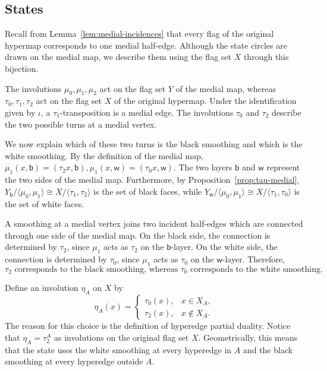 \documentclass{article}
\theoremstyle{definition}
\theoremstyle{remark}
\begin{document}
\subsection{States}

Recall from Lemma~\ref{lem:medial-incidences} that every flag of the original hypermap corresponds to one medial half-edge. Although the state circles are drawn on the medial
map, we describe them using the flag set $X$ through this bijection.

The involutions $\mu_0,\mu_1,\mu_2$ act on the flag set $Y$ of the medial
map, whereas $\tau_0,\tau_1,\tau_2$ act on the flag set $X$ of the original
hypermap. Under the identification given by $\iota$, a
$\tau_1$-transposition is a medial edge. The involutions $\tau_0$ and
$\tau_2$ describe the two possible turns at a medial vertex.

We now explain which of these two turns is the black smoothing and which is
the white smoothing. By the definition of the medial map,
 $\mu_1(x,\mathsf b)=(\tau_2x,\mathsf b),\mu_1(x,\mathsf w)=(\tau_0x,\mathsf w)$. The two layers $\mathsf b$ and $\mathsf w$ represent the two sides of the
medial map. Furthermore, by Proposition~\ref{prop:tau-medial},
$ Y_{\mathsf b}/\langle\mu_0,\mu_1\rangle
 \cong X/\langle\tau_1,\tau_2\rangle$ is the set of black faces, while $Y_{\mathsf w}/\langle\mu_0,\mu_1\rangle
 \cong X/\langle\tau_1,\tau_0\rangle$ is the set of white faces.

A smoothing at a medial vertex joins two incident half-edges which are
connected through one side of the medial map. On the black side, the
connection is determined by $\tau_2$, since $\mu_1$ acts as $\tau_2$ on the
$\mathsf b$-layer. On the white side, the connection is determined by
$\tau_0$, since $\mu_1$ acts as $\tau_0$ on the $\mathsf w$-layer. Therefore,
\[
 \tau_2 \text{ corresponds to the black smoothing, whereas } \tau_0 \text{ corresponds to the white smoothing}.
\]

Define an involution $\eta_A$ on $X$ by
\[
 \eta_A(x)=
 \begin{cases}
   \tau_0(x),&x\in X_A,\\
   \tau_2(x),&x\notin X_A.
 \end{cases}
\]
The reason for this choice is the definition of hyperedge partial duality.
Notice that $\eta_A=\tau_2^A$ as involutions on the original flag set $X$.
Geometrically, this means that the state uses the white smoothing at every
hyperedge in $A$ and the black smoothing at every hyperedge outside $A$.
\end{document}
